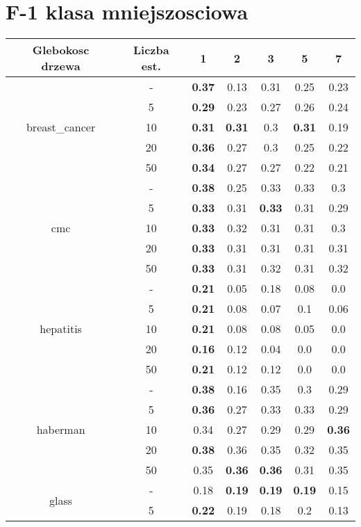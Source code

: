 \documentclass{article}%
\begin{document}
\section*{F{-}1 klasa mniejszosciowa}%
\begin{longtable}{c|c|ccccc}%
\hline%
Glebokosc drzewa&Liczba est.&1&2&3&5&7\\%
\hline%
\multirow{5}{*}{breast\_cancer}&{-}&\textbf{0.37}&0.13&0.31&0.25&0.23\\%
\cline{2%
-%
7}%
&5&\textbf{0.29}&0.23&0.27&0.26&0.24\\%
\cline{2%
-%
7}%
&10&\textbf{0.31}&\textbf{0.31}&0.3&\textbf{0.31}&0.19\\%
\cline{2%
-%
7}%
&20&\textbf{0.36}&0.27&0.3&0.25&0.22\\%
\cline{2%
-%
7}%
&50&\textbf{0.34}&0.27&0.27&0.22&0.21\\%
\hline%
\multirow{5}{*}{cmc}&{-}&\textbf{0.38}&0.25&0.33&0.33&0.3\\%
\cline{2%
-%
7}%
&5&\textbf{0.33}&0.31&\textbf{0.33}&0.31&0.29\\%
\cline{2%
-%
7}%
&10&\textbf{0.33}&0.32&0.31&0.31&0.3\\%
\cline{2%
-%
7}%
&20&\textbf{0.33}&0.31&0.31&0.31&0.31\\%
\cline{2%
-%
7}%
&50&\textbf{0.33}&0.31&0.32&0.31&0.32\\%
\hline%
\multirow{5}{*}{hepatitis}&{-}&\textbf{0.21}&0.05&0.18&0.08&0.0\\%
\cline{2%
-%
7}%
&5&\textbf{0.21}&0.08&0.07&0.1&0.06\\%
\cline{2%
-%
7}%
&10&\textbf{0.21}&0.08&0.08&0.05&0.0\\%
\cline{2%
-%
7}%
&20&\textbf{0.16}&0.12&0.04&0.0&0.0\\%
\cline{2%
-%
7}%
&50&\textbf{0.21}&0.12&0.12&0.0&0.0\\%
\hline%
\multirow{5}{*}{haberman}&{-}&\textbf{0.38}&0.16&0.35&0.3&0.29\\%
\cline{2%
-%
7}%
&5&\textbf{0.36}&0.27&0.33&0.33&0.29\\%
\cline{2%
-%
7}%
&10&0.34&0.27&0.29&0.29&\textbf{0.36}\\%
\cline{2%
-%
7}%
&20&\textbf{0.38}&0.36&0.35&0.32&0.35\\%
\cline{2%
-%
7}%
&50&0.35&\textbf{0.36}&\textbf{0.36}&0.31&0.35\\%
\hline%
\multirow{5}{*}{glass}&{-}&0.18&\textbf{0.19}&\textbf{0.19}&\textbf{0.19}&0.15\\%
\cline{2%
-%
7}%
&5&\textbf{0.22}&0.19&0.18&0.2&0.13\\%

\end{longtable}
\end{document}
